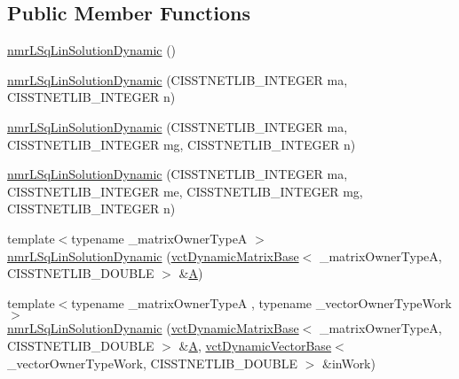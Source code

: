 \subsection*{Public Member Functions}
\begin{DoxyCompactItemize}
\item 
\hyperlink{classnmr_l_sq_lin_solution_dynamic_ae6a2c99c6f99fb37fcab94484dc319f7}{nmr\+L\+Sq\+Lin\+Solution\+Dynamic} ()
\item 
\hyperlink{classnmr_l_sq_lin_solution_dynamic_a8e67803f31831fc9fc7f21bc2e37933d}{nmr\+L\+Sq\+Lin\+Solution\+Dynamic} (C\+I\+S\+S\+T\+N\+E\+T\+L\+I\+B\+\_\+\+I\+N\+T\+E\+G\+E\+R ma, C\+I\+S\+S\+T\+N\+E\+T\+L\+I\+B\+\_\+\+I\+N\+T\+E\+G\+E\+R n)
\item 
\hyperlink{classnmr_l_sq_lin_solution_dynamic_a51d28a3a7089cd4f097ffb86d132f81c}{nmr\+L\+Sq\+Lin\+Solution\+Dynamic} (C\+I\+S\+S\+T\+N\+E\+T\+L\+I\+B\+\_\+\+I\+N\+T\+E\+G\+E\+R ma, C\+I\+S\+S\+T\+N\+E\+T\+L\+I\+B\+\_\+\+I\+N\+T\+E\+G\+E\+R mg, C\+I\+S\+S\+T\+N\+E\+T\+L\+I\+B\+\_\+\+I\+N\+T\+E\+G\+E\+R n)
\item 
\hyperlink{classnmr_l_sq_lin_solution_dynamic_a4a3cf1195435c4d3d2dff86379c0837c}{nmr\+L\+Sq\+Lin\+Solution\+Dynamic} (C\+I\+S\+S\+T\+N\+E\+T\+L\+I\+B\+\_\+\+I\+N\+T\+E\+G\+E\+R ma, C\+I\+S\+S\+T\+N\+E\+T\+L\+I\+B\+\_\+\+I\+N\+T\+E\+G\+E\+R me, C\+I\+S\+S\+T\+N\+E\+T\+L\+I\+B\+\_\+\+I\+N\+T\+E\+G\+E\+R mg, C\+I\+S\+S\+T\+N\+E\+T\+L\+I\+B\+\_\+\+I\+N\+T\+E\+G\+E\+R n)
\item 
{\footnotesize template$<$typename \+\_\+matrix\+Owner\+Type\+A $>$ }\\\hyperlink{classnmr_l_sq_lin_solution_dynamic_a7279de18679a05313a2f26a10c5aca9f}{nmr\+L\+Sq\+Lin\+Solution\+Dynamic} (\hyperlink{classvct_dynamic_matrix_base}{vct\+Dynamic\+Matrix\+Base}$<$ \+\_\+matrix\+Owner\+Type\+A, C\+I\+S\+S\+T\+N\+E\+T\+L\+I\+B\+\_\+\+D\+O\+U\+B\+L\+E $>$ \&\hyperlink{classnmr_l_sq_lin_solution_dynamic_aa4a41abac141e2e55dd5cafb59169dfd}{A})
\item 
{\footnotesize template$<$typename \+\_\+matrix\+Owner\+Type\+A , typename \+\_\+vector\+Owner\+Type\+Work $>$ }\\\hyperlink{classnmr_l_sq_lin_solution_dynamic_a00b899c2a33937aa3944734a9a683b8e}{nmr\+L\+Sq\+Lin\+Solution\+Dynamic} (\hyperlink{classvct_dynamic_matrix_base}{vct\+Dynamic\+Matrix\+Base}$<$ \+\_\+matrix\+Owner\+Type\+A, C\+I\+S\+S\+T\+N\+E\+T\+L\+I\+B\+\_\+\+D\+O\+U\+B\+L\+E $>$ \&\hyperlink{classnmr_l_sq_lin_solution_dynamic_aa4a41abac141e2e55dd5cafb59169dfd}{A}, \hyperlink{classvct_dynamic_vector_base}{vct\+Dynamic\+Vector\+Base}$<$ \+\_\+vector\+Owner\+Type\+Work, C\+I\+S\+S\+T\+N\+E\+T\+L\+I\+B\+\_\+\+D\+O\+U\+B\+L\+E $>$ \&in\+Work)

\end{DoxyCompactItemize}
